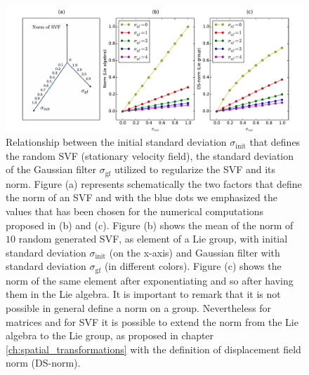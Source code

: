 \begin{figure}[!ht]
	\hspace{-1cm}
	\includegraphics[scale=0.51]{figures/SVF_sigma_means_comparisons.pdf}
	\caption{Relationship between the initial standard deviation $\sigma_{\text{init}}$ that defines the random SVF (stationary velocity field), the standard deviation of the Gaussian filter $\sigma_{\text{gf}}$ utilized to regularize the SVF and its norm. Figure (a) represents schematically the two factors that define the norm of an SVF and with the blue dots we emphasized the values that has been chosen for the numerical computations proposed in (b) and (c). Figure (b) shows the mean of the norm of $10$ random generated SVF, as element of a Lie group, with initial standard deviation $\sigma_{\text{init}}$ (on the x-axis) and Gaussian filter with standard deviation $\sigma_{\text{gf}}$ (in different colors).
		Figure (c) shows the norm of the same element after exponentiating and so after having them in the Lie algebra.
		It is important to remark that it is not possible in general define a norm on a group. Nevertheless for matrices and for SVF it is possible to extend the norm from the Lie algebra to the Lie group, as proposed in chapter \ref{ch:spatial_transformations} with the definition of displacement field norm (DS-norm). }
	\label{fig:SVF_sigma_means_comparisons}
\end{figure}

